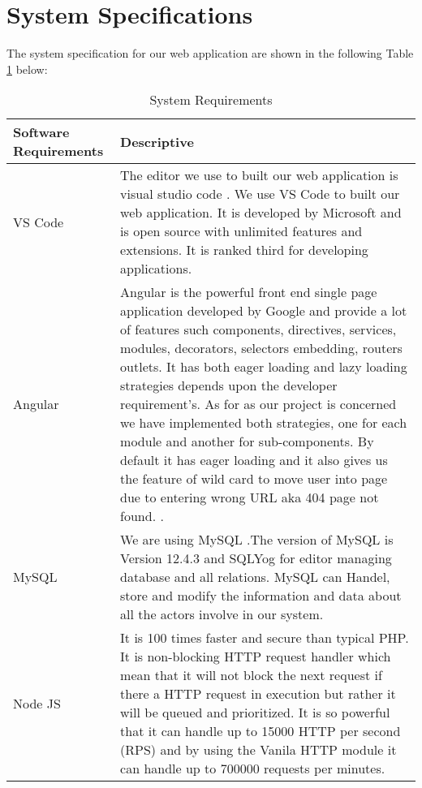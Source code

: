 \section{System Specifications}
The system specification for our web application are shown in the following Table \ref{tab:System Requirement} below:
\\
\begin{table}[!h]

    \centering
    \begin{tabular}{|p{4cm}|p{10cm}|}
        \hline Software Requirements & Descriptive  \\
        \hline
        VS Code  & The editor we use to built our web application is visual studio code \cite{microsoft_2021}. We use VS Code to built our web application. It is developed by Microsoft and is open source with unlimited features and extensions. It is ranked third for developing applications. \\ 
        \hline
        Angular &Angular is the powerful front end single page application developed by Google and provide a lot of features such components, directives, services, modules, decorators, selectors embedding, routers outlets. It has both eager loading and lazy loading strategies depends upon the developer requirement's. As for as our project is concerned we have implemented both strategies, one for each module and another for sub-components. By default it has eager loading and it also gives us the feature of wild card to move user into page due to entering wrong URL aka 404 page not found.
         \cite{Ang}. \\
        \hline
        MySQL & We are using MySQL \cite{ref3}.The version of MySQL is Version 12.4.3 and SQLYog for editor managing database and all  relations.
        MySQL can Handel, store and modify the information and data about all the actors involve in our system. \\
        \hline
        Node JS & It is 100 times faster and secure than typical PHP. It is non-blocking HTTP request handler which mean that it will not block the next request if there a HTTP request in execution but rather it will be queued and prioritized. It is so powerful that it can handle up to 15000 HTTP per second (RPS) and by using the Vanila HTTP module it can handle up to 700000 requests per minutes.\\
        \hline
    \end{tabular}
    \caption{System Requirements}
    \label{tab:System Requirement}
\end{table}
